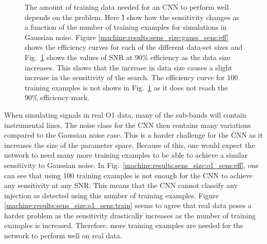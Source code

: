 \begin{figure}[h]
\begin{subfigure}[h]{0.5\textwidth}
		\caption{}
		\label{machine:results:sens_size:gauss_sens:train}
	\end{subfigure}
	\caption[Sensitivity with size of data set for Gaussian noise simulations.]{The amount of training data needed for an \gls{CNN} to perform well depends on the problem. Here I show how the sensitivity changes as a function of the number of training examples for simulations in Gaussian noise. Figure \ref{machine:results:sens_size:gauss_sens:eff} shows the efficiency curves for each of the different data-set sizes and Fig.~\ref{machine:results:sens_size:gauss_sens:train} shows the values of \gls{SNR} at 90\% efficiency as the data size increases. This shows that the increase in data size causes a slight increase in the sensitivity of the search. The efficiency curve for 100 training examples is not shows in Fig.~\ref{machine:results:sens_size:gauss_sens:train} as it does not reach the 90\% efficiency mark.}
	\label{machine:results:sens_size:gauss_sens}
\end{figure}

When simulating signals in real O1 data, many of the sub-bands will contain instrumental lines. 
The noise class for the \gls{CNN} then contains many variations compared to the Gaussian noise case. 
This is a harder challenge for the \gls{CNN} as it increases the size of the parameter space.
Because of this, one would expect the network to need many more training examples to be able to achieve a similar sensitivity to Gaussian noise.
In Fig.~\ref{machine:results:sens_size:o1_sens:eff}, one can see that using 100 training examples is not enough for the \gls{CNN} to achieve any sensitivity at any \gls{SNR}. This means that the \gls{CNN} cannot classify any injection as detected using this number of training examples.
Figure \ref{machine:results:sens_size:o1_sens:train} seems to agree that real data poses a harder problem as the sensitivity drastically increases as the number of training examples is increased.
Therefore, more training examples are needed for the network to perform well on real data.

